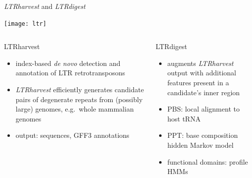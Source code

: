 \documentclass[final]{beamer}
\begin{document}
\begin{frame}[fragile]
\begin{columns}[t]
\begin{column}{.45\linewidth}
        \begin{block}{\emph{LTRharvest} and \emph{LTRdigest}}
          \centerline{\texttt{[image: ltr]}}
          \vspace{1.5cm}
          \begin{columns}
            \begin{column}{.45\linewidth}
              \alert{LTRharvest}~\cite{ELL:KUR:WIL:2008}
              \begin{itemize}
                \item index-based \emph{de novo} detection and annotation of
                      LTR retrotransposons
                \item \emph{LTRharvest} efficiently generates candidate pairs
                      of degenerate repeats from (possibly large) genomes,
                      e.g.\ whole mammalian genomes
                \item output: sequences, GFF3 annotations
              \end{itemize}
              \end{column}
            \begin{column}{.45\linewidth}
              \alert{LTRdigest}~\cite{STEI:WIL:GRE:KUR:2009}
              \begin{itemize}
                \item augments \emph{LTRharvest} output with additional
                      features present in a candidate's inner region
                \item PBS: local alignment to host tRNA
                \item PPT: base composition hidden Markov model
                \item functional domains: profile HMMs
              \end{itemize}
            \end{column}
          \end{columns}
        \end{block}


\end{column}
\end{columns}
\end{frame}
\end{document}
